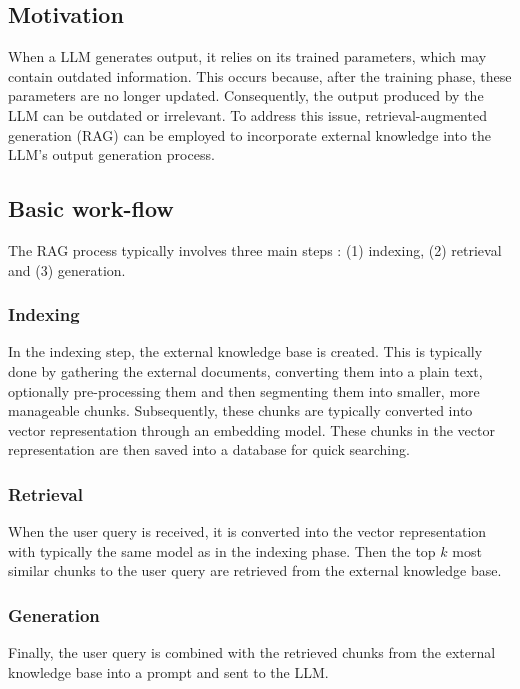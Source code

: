 \subsection{Motivation}

When a LLM generates output, it relies on its trained parameters, which may contain outdated information. This occurs because, after the training phase, these parameters are no longer updated. Consequently, the output produced by the LLM can be outdated or irrelevant. To address this issue, retrieval-augmented generation (RAG) can be employed to incorporate external knowledge into the LLM's output generation process.


\subsection{Basic work-flow}

The RAG process typically involves three main steps \cite{Gao2023}: (1) indexing, (2) retrieval and (3) generation.

\subsubsection{Indexing}

In the indexing step, the external knowledge base is created. This is typically done by gathering the external documents, converting them into a plain text, optionally pre-processing them and then segmenting them into smaller, more manageable chunks. Subsequently, these chunks are typically converted into vector representation through an embedding model. These chunks in the vector representation are then saved into a database for quick searching.


\subsubsection{Retrieval}

When the user query is received, it is converted into the vector representation with typically the same model as in the indexing phase. Then the top $k$ most similar chunks to the user query are retrieved from the external knowledge base.


\subsubsection{Generation}

Finally, the user query is combined with the retrieved chunks from the external knowledge base into a prompt and sent to the LLM.


